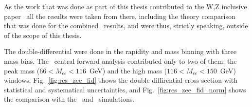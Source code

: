 As the work that was done as part of this thesis contributed to the W,Z inclusive paper~\cite{lib:wz2011} all the results were taken from there, including the theory comparison that was done for the combined \Zll\ results, and were thus, strictly speaking, outside of the scope of this thesis.

The double-differential were done in the rapidity and mass binning with three mass bins. The \Zee\ central-forward analysis contributed only to two of them: the peak mass ($66 < M_{ee} < 116$~GeV) and the high mass ($116 < M_{ee} < 150$~GeV) windows. Fig.~\ref{fig:res_zee_fid} shows the double-diffirential cross-section with statistical and systematical uncertainties, and Fig.~\ref{fig:res_zee_fid_norm} shows the comparison with the \Powheg\ and \Mcatnlo\ simulations.

\begin{figure}
\end{figure}


